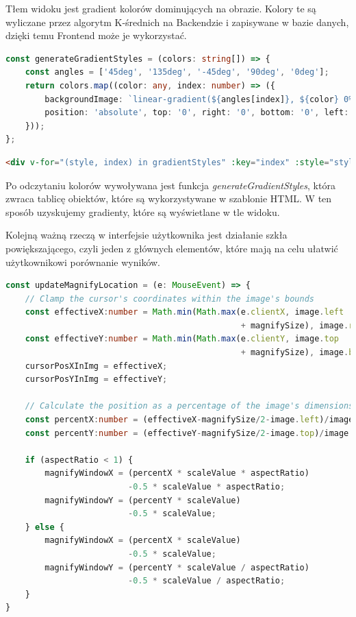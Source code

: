 Tłem widoku jest gradient kolorów dominujących na obrazie. Kolory te są wyliczane przez algorytm K-średnich na Backendzie i zapisywane w bazie danych, dzięki temu Frontend może je wykorzystać. 

\begin{lstlisting}[language=TypeScript, caption=Wyznaczanie gradientów z kolorów dominujących., label={lst:colors}]
const generateGradientStyles = (colors: string[]) => {
    const angles = ['45deg', '135deg', '-45deg', '90deg', '0deg'];
    return colors.map((color: any, index: number) => ({
        backgroundImage: `linear-gradient(${angles[index]}, ${color} 0%, transparent 100%)`,
        position: 'absolute', top: '0', right: '0', bottom: '0', left: '0',
    }));
};
\end{lstlisting}

\begin{lstlisting}[language=HTML, caption=Rysowanie kolorów dominujących (HTML).]
<div v-for="(style, index) in gradientStyles" :key="index" :style="style"/>
\end{lstlisting}

Po odczytaniu kolorów wywoływana jest funkcja \textit{generateGradientStyles}, która zwraca tablicę obiektów, które są wykorzystywane w szablonie HTML. W ten sposób uzyskujemy gradienty, które są wyświetlane w tle widoku.

Kolejną ważną rzeczą w interfejsie użytkownika jest działanie szkła powiększającego, czyli jeden z głównych elementów, które mają na celu ułatwić użytkownikowi porównanie wyników.

\begin{lstlisting}[language=TypeScript, caption=Implementacja szkła powiększającego (TypeScript)., label={lst:zoom}]
const updateMagnifyLocation = (e: MouseEvent) => {
    // Clamp the cursor's coordinates within the image's bounds
    const effectiveX:number = Math.min(Math.max(e.clientX, image.left   
                                                + magnifySize), image.right);
    const effectiveY:number = Math.min(Math.max(e.clientY, image.top    
                                                + magnifySize), image.bottom);
    cursorPosXInImg = effectiveX;
    cursorPosYInImg = effectiveY;

    // Calculate the position as a percentage of the image's dimensions
    const percentX:number = (effectiveX-magnifySize/2-image.left)/image.width;
    const percentY:number = (effectiveY-magnifySize/2-image.top)/image.height;

    if (aspectRatio < 1) {
        magnifyWindowX = (percentX * scaleValue * aspectRatio) 
                         -0.5 * scaleValue * aspectRatio;
        magnifyWindowY = (percentY * scaleValue) 
                         -0.5 * scaleValue;
    } else {
        magnifyWindowX = (percentX * scaleValue) 
                         -0.5 * scaleValue;
        magnifyWindowY = (percentY * scaleValue / aspectRatio) 
                         -0.5 * scaleValue / aspectRatio;
    }
}
\end{lstlisting}

